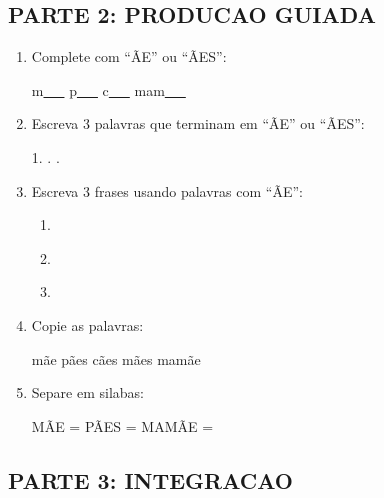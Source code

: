 \begin{exercicio}
\subsection*{PARTE 2: PRODUCAO GUIADA}

\begin{enumerate}[resume]
  \item Complete com ``\~AE'' ou ``\~AES'':
  \begin{center}
  m\underline{~~~} \quad p\underline{~~~} \quad c\underline{~~~} \quad mam\underline{~~~}
  \end{center}

  \item Escreva 3 palavras que terminam em ``\~AE'' ou ``\~AES'':
  \begin{center}
  1. \underline{\hspace{3cm}} . \underline{\hspace{3cm}} . \underline{\hspace{3cm}}
  \end{center}

  \item Escreva 3 frases usando palavras com ``\~AE'':
  \begin{enumerate}[label=\alph*)]
    \item \underline{\hspace{8cm}}
    \item \underline{\hspace{8cm}}
    \item \underline{\hspace{8cm}}
  \end{enumerate}

  \item Copie as palavras:
  \begin{center}
  m\~ae \quad p\~aes \quad c\~aes \quad m\~aes \quad mam\~ae
  \end{center}

  \item Separe em silabas:
  \begin{center}
  M\~AE = \underline{\hspace{1cm}} \quad P\~AES = \underline{\hspace{1cm}} \quad MAM\~AE = \underline{\hspace{1cm}} \underline{\hspace{1cm}}
  \end{center}
\end{enumerate}

\subsection*{PARTE 3: INTEGRACAO}


\end{exercicio}
